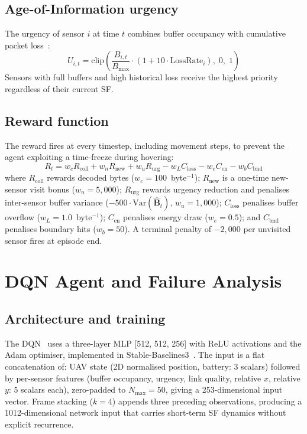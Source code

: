 \documentclass[conference]{IEEEtran}
\begin{document}
\subsection{Age-of-Information urgency}

The urgency of sensor $i$ at time $t$ combines buffer occupancy with cumulative packet loss~\cite{kaul2012realtime,abdelmagid2019aoi}:
\begin{equation}
U_{i,t} = \mathrm{clip}\!\left(\frac{B_{i,t}}{B_{\max}} \cdot (1 + 10 \cdot \mathrm{LossRate}_i),\; 0,\; 1\right)
\label{eq:urgency}
\end{equation}
Sensors with full buffers and high historical loss receive the highest priority regardless of their current SF.

\subsection{Reward function}

The reward fires at every timestep, including movement steps, to prevent the agent exploiting a time-freeze during hovering:
\begin{equation}
R_t = w_c R_{\text{coll}} + w_n R_{\text{new}} + w_u R_{\text{urg}} - w_L C_{\text{loss}} - w_e C_{\text{en}} - w_b C_{\text{bnd}}
\label{eq:reward}
\end{equation}
where $R_{\text{coll}}$ rewards decoded bytes ($w_c{=}100$~byte$^{-1}$); $R_{\text{new}}$ is a one-time new-sensor visit bonus ($w_n{=}5{,}000$); $R_{\text{urg}}$ rewards urgency reduction and penalises inter-sensor buffer variance ($-500{\cdot}\mathrm{Var}(\hat{\mathbf{B}}_t)$, $w_u{=}1{,}000$); $C_{\text{loss}}$ penalises buffer overflow ($w_L{=}1.0$~byte$^{-1}$); $C_{\text{en}}$ penalises energy draw ($w_e{=}0.5$); and $C_{\text{bnd}}$ penalises boundary hits ($w_b{=}50$). A terminal penalty of $-2{,}000$ per unvisited sensor fires at episode end.

\section{DQN Agent and Failure Analysis}

\subsection{Architecture and training}

The DQN~\cite{mnih2015humanlevel} uses a three-layer MLP [512, 512, 256] with ReLU activations and the Adam optimiser, implemented in Stable-Baselines3~\cite{raffin2021stable}. The input is a flat concatenation of: UAV state (2D normalised position, battery: 3 scalars) followed by per-sensor features (buffer occupancy, urgency, link quality, relative $x$, relative $y$: 5 scalars each), zero-padded to $N_{\max}{=}50$, giving a 253-dimensional input vector. Frame stacking ($k{=}4$) appends three preceding observations, producing a 1012-dimensional network input that carries short-term SF dynamics without explicit recurrence.
\end{document}
